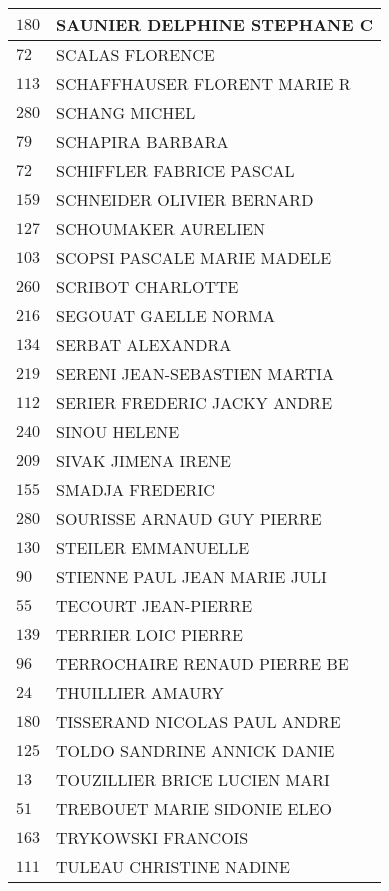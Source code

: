 \begin{xltabular}{\linewidth}{|l|X|}
    \hline
    $180$ & SAUNIER DELPHINE STEPHANE C \\
    \hline
    $72$ & SCALAS FLORENCE \\
    \hline
    $113$ & SCHAFFHAUSER FLORENT MARIE R \\
    \hline
    $280$ & SCHANG MICHEL \\
    \hline
    $79$ & SCHAPIRA BARBARA \\
    \hline
    $72$ & SCHIFFLER FABRICE PASCAL \\
    \hline
    $159$ & SCHNEIDER OLIVIER BERNARD \\
    \hline
    $127$ & SCHOUMAKER AURELIEN \\
    \hline
    $103$ & SCOPSI PASCALE MARIE MADELE \\
    \hline
    $260$ & SCRIBOT CHARLOTTE \\
    \hline
    $216$ & SEGOUAT GAELLE NORMA \\
    \hline
    $134$ & SERBAT ALEXANDRA \\
    \hline
    $219$ & SERENI JEAN-SEBASTIEN MARTIA \\
    \hline
    $112$ & SERIER FREDERIC JACKY ANDRE \\
    \hline
    $240$ & SINOU HELENE \\
    \hline
    $209$ & SIVAK JIMENA IRENE \\
    \hline
    $155$ & SMADJA FREDERIC \\
    \hline
    $280$ & SOURISSE ARNAUD GUY PIERRE \\
    \hline
    $130$ & STEILER EMMANUELLE \\
    \hline
    $90$ & STIENNE PAUL JEAN MARIE JULI \\
    \hline
    $55$ & TECOURT JEAN-PIERRE \\
    \hline
    $139$ & TERRIER LOIC PIERRE \\
    \hline
    $96$ & TERROCHAIRE RENAUD PIERRE BE \\
    \hline
    $24$ & THUILLIER AMAURY \\
    \hline
    $180$ & TISSERAND NICOLAS PAUL ANDRE \\
    \hline
    $125$ & TOLDO SANDRINE ANNICK DANIE \\
    \hline
    $13$ & TOUZILLIER BRICE LUCIEN MARI \\
    \hline
    $51$ & TREBOUET MARIE SIDONIE ELEO \\
    \hline
    $163$ & TRYKOWSKI FRANCOIS \\
    \hline
    $111$ & TULEAU CHRISTINE NADINE \\

\end{xltabular}
